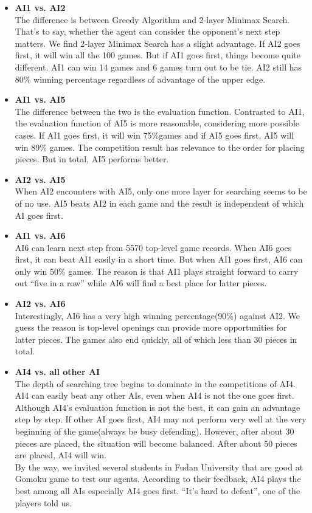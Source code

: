 \documentclass[12pt,a4paper]{article}
\begin{document}
\begin{itemize}
\item \textbf{AI1 vs. AI2}\\
The difference is between Greedy Algorithm and 2-layer Minimax Search. That's to say, whether the agent can consider the opponent's next step matters. We find 2-layer Minimax Search has a slight advantage. If AI2 goes first, it will win all the 100 games. But if AI1 goes first, things become quite different. AI1 can win 14 games and 6 games turn out to be tie. AI2 still has 80\% winning percentage regardless of advantage of the upper edge.
\item \textbf{AI1 vs. AI5}\\
The difference between the two is the evaluation function. Contrasted to AI1, the evaluation function of AI5 is more reasonable, considering more possible cases. If AI1 goes first, it will win 75\%games and if AI5 goes first, AI5 will win 89\% games. The competition result has relevance to the order for placing pieces. But in total, AI5 performs better.
\item \textbf{AI2 vs. AI5}\\
When AI2 encounters with AI5, only one more layer for searching seems to be of no use. AI5 beats AI2 in each game and the result is independent of which AI goes first.
\item \textbf{AI1 vs. AI6}\\
AI6 can learn next step from 5570 top-level game records. When AI6 goes first, it can beat AI1 easily in a short time. But when AI1 goes first, AI6 can only win 50\% games. The reason is that AI1 plays straight forward to carry out ``five in a row'' while AI6 will find a best place for latter pieces.
\item \textbf{AI2 vs. AI6}\\
Interestingly, AI6 has a very high winning percentage(90\%) against AI2. We guess the reason is top-level openings can provide more opportunities for latter pieces. The games also end quickly, all of which less than 30 pieces in total.
\item \textbf{AI4 vs. all other AI}\\
The depth of searching tree begins to dominate in the competitions of AI4. AI4 can easily beat any other AIs, even when AI4 is not the one goes first. \\
Although AI4's evaluation function is not the best, it can gain an advantage step by step. If other AI goes first, AI4 may not perform very well at the very beginning of the game(always be busy defending). However, after about 30 pieces are placed, the situation will become balanced. After about 50 pieces are placed, AI4 will win.\\
By the way, we invited several students in Fudan University that are good at Gomoku game to test our agents. According to their feedback, AI4 plays the best among all AIs especially AI4 goes first. ``It's hard to defeat'', one of the players told us.
\end{itemize}




\end{document}
